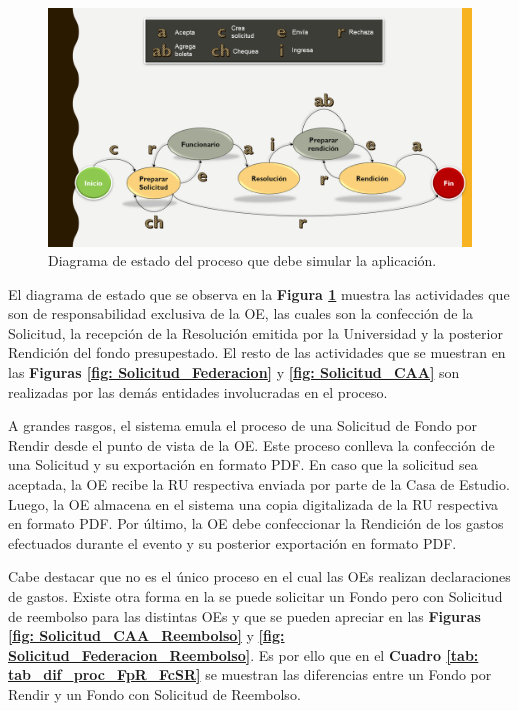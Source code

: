 \begin{figure}[h!tb]
    \hspace{-9mm}
    \includegraphics[width=1.1\textwidth]{Imagenes/Diagrama_de_estado.png}
    \caption{\label{fig: diagrama_estado}Diagrama de estado del proceso que debe simular la aplicación.}
\end{figure}

El diagrama de estado que se observa en la \textbf{Figura \ref{fig: diagrama_estado}} muestra las actividades que son de responsabilidad exclusiva de la OE, las cuales son la confección de la Solicitud, la recepción de la Resolución emitida por la Universidad y la posterior Rendición del fondo presupestado. El resto de las actividades que se muestran en las \textbf{Figuras \ref{fig: Solicitud_Federacion}} y \textbf{\ref{fig: Solicitud_CAA}} son realizadas por las demás entidades involucradas en el proceso.

A grandes rasgos, el sistema emula el proceso de una Solicitud de Fondo por Rendir desde el punto de vista de la OE. Este proceso conlleva la confección de una Solicitud y su exportación en formato PDF. En caso que la solicitud sea aceptada, la OE recibe la RU respectiva enviada por parte de la Casa de Estudio. Luego, la OE almacena en el sistema una copia digitalizada de la RU respectiva en formato PDF. Por último, la OE debe confeccionar la Rendición de los gastos efectuados durante el evento y su posterior exportación en formato PDF.


Cabe destacar que no es el único proceso en el cual las OEs realizan declaraciones de gastos. Existe otra forma en la se puede solicitar un Fondo pero con Solicitud de reembolso para las distintas OEs y que se pueden apreciar en las \textbf{Figuras \ref{fig: Solicitud_CAA_Reembolso}} y \textbf{\ref{fig: Solicitud_Federacion_Reembolso}}. Es por ello que en el  \textbf{Cuadro \ref{tab: tab_dif_proc_FpR_FcSR}} se muestran las diferencias entre un Fondo por Rendir y un Fondo con Solicitud de Reembolso.


